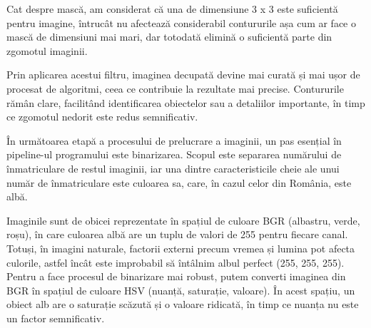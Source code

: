 \documentclass[a4paper,12pt]{report}
\begin{document}
Cat despre mască, am considerat că una de dimensiune 3 x 3 este suficientă pentru imagine, întrucât nu afectează considerabil contururile așa cum ar face o mască de dimensiuni mai mari, dar totodată elimină o suficientă parte din zgomotul imaginii.

Prin aplicarea acestui filtru, imaginea decupată devine mai curată și mai ușor de procesat de algoritmi, ceea ce contribuie la rezultate mai precise. Contururile rămân clare, facilitând identificarea obiectelor sau a detaliilor importante, în timp ce zgomotul nedorit este redus semnificativ.

În următoarea etapă a procesului de prelucrare a imaginii, un pas esențial în pipeline-ul programului este binarizarea. Scopul este separarea numărului de înmatriculare de restul imaginii, iar una dintre caracteristicile cheie ale unui număr de înmatriculare este culoarea sa, care, în cazul celor din România, este albă.

Imaginile sunt de obicei reprezentate în spațiul de culoare BGR (albastru, verde, roșu), în care culoarea albă are un tuplu de valori de 255 pentru fiecare canal. Totuși, în imagini naturale, factorii externi precum vremea și lumina pot afecta culorile, astfel încât este improbabil să întâlnim albul perfect (255, 255, 255). Pentru a face procesul de binarizare mai robust, putem converti imaginea din BGR în spațiul de culoare HSV (nuanță, saturație, valoare). În acest spațiu, un obiect alb are o saturație scăzută și o valoare ridicată, în timp ce nuanța nu este un factor semnificativ.
\end{document}
